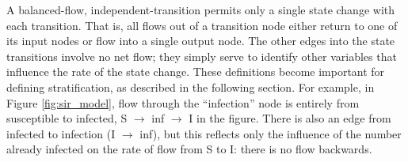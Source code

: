 A balanced-flow, independent-transition \Petrinet{} permits only a single state
change with each transition.  That is, all flows out of a transition node either return to one of its input nodes or flow into a single output node.
The other edges into the state transitions involve no net flow; they simply serve to identify other variables that influence the rate of the state change.
These definitions become important for
defining \Petrinet{} stratification, as described in the following section.
For example, in Figure \ref{fig:sir_model}, flow through the ``infection'' node is entirely from susceptible to infected, S $\rightarrow$ inf $\rightarrow$ I in the figure.  There is also an edge from infected to infection (I $\rightarrow$ inf), but this reflects only the influence of the number already infected on the rate of flow from S to I: there is no flow backwards.




